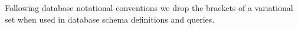 %
%
Following database notational conventions
we drop the brackets of a variational set when used in database
schema definitions and queries.

